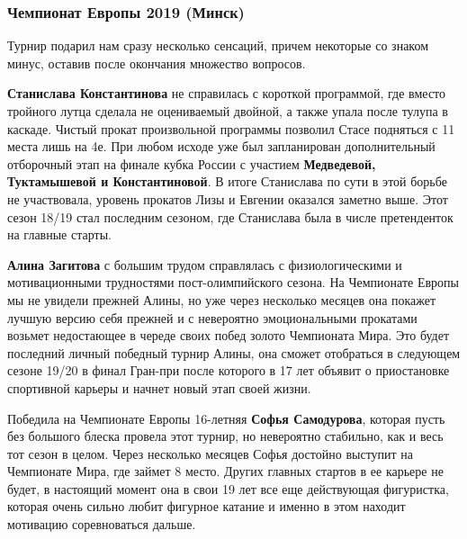  
 
 
 
 
\subsubsection{Чемпионат Европы 2019 (Минск)}
\label{sec:04_01_2022.yz.figurka_ot_maksima_jagudina.1.chempionaty_evropy.9.minsk_2019}

Турнир подарил нам сразу несколько сенсаций, причем некоторые со знаком минус,
оставив после окончания множество вопросов.


\textbf{Станислава Константинова} не справилась с короткой программой, где вместо
тройного лутца сделала не оцениваемый двойной, а также упала после тулупа в
каскаде. Чистый прокат произвольной программы позволил Стасе подняться с 11
места лишь на 4е. При любом исходе уже был запланирован дополнительный
отборочный этап на финале кубка России с участием \textbf{Медведевой, Туктамышевой и
Константиновой}. В итоге Станислава по сути в этой борьбе не участвовала,
уровень прокатов Лизы и Евгении оказался заметно выше. Этот сезон 18/19 стал
последним сезоном, где Станислава была в числе претенденток на главные старты.


\textbf{Алина Загитова} с большим трудом справлялась с физиологическими и мотивационными
трудностями пост-олимпийского сезона. На Чемпионате Европы мы не увидели
прежней Алины, но уже через несколько месяцев она покажет лучшую версию себя
прежней и с невероятно эмоциональными прокатами возьмет недостающее в череде
своих побед золото Чемпионата Мира. Это будет последний личный победный турнир
Алины, она сможет отобраться в следующем сезоне 19/20 в финал Гран-при после
которого в 17 лет объявит о приостановке спортивной карьеры и начнет новый этап
своей жизни.

Победила на Чемпионате Европы 16-летняя \textbf{Софья Самодурова}, которая пусть без
большого блеска провела этот турнир, но невероятно стабильно, как и весь тот
сезон в целом. Через несколько месяцев Софья достойно выступит на Чемпионате
Мира, где займет 8 место. Других главных стартов в ее карьере не будет, в
настоящий момент она в свои 19 лет все еще действующая фигуристка, которая
очень сильно любит фигурное катание и именно в этом находит мотивацию
соревноваться дальше. 
